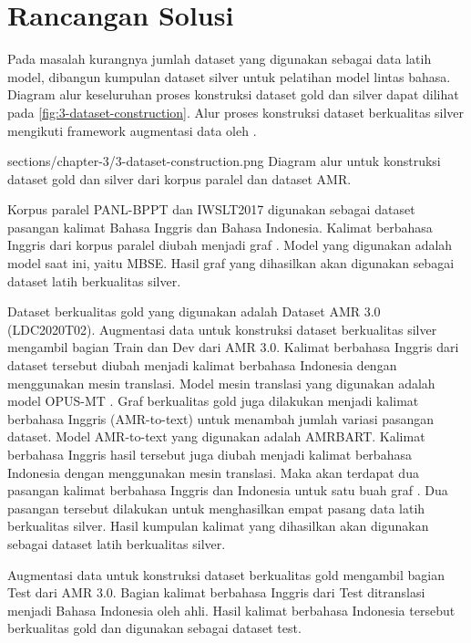 \section{Rancangan Solusi}

Pada masalah kurangnya jumlah dataset yang digunakan sebagai data latih model, dibangun kumpulan dataset silver untuk pelatihan model \amrparsing{} lintas bahasa.
Diagram alur keseluruhan proses konstruksi dataset gold dan silver dapat dilihat pada \cref{fig:3-dataset-construction}.
Alur proses konstruksi dataset berkualitas silver mengikuti framework augmentasi data oleh \textcite{lee2022}.

  {sections/chapter-3/3-dataset-construction.png}
  {Diagram alur untuk konstruksi dataset gold dan silver dari korpus paralel dan dataset AMR.}

Korpus paralel PANL-BPPT dan IWSLT2017 digunakan sebagai dataset pasangan kalimat Bahasa Inggris dan Bahasa Indonesia.
Kalimat berbahasa Inggris dari korpus paralel diubah menjadi graf \AMR{}.
Model \amrparsing{} yang digunakan adalah model \sota{} saat ini, yaitu \gls{MBSE}.
Hasil graf \AMR{} yang dihasilkan akan digunakan sebagai dataset latih berkualitas silver.

Dataset \AMR{} berkualitas gold yang digunakan adalah Dataset AMR 3.0 (LDC2020T02).
Augmentasi data untuk konstruksi dataset berkualitas silver mengambil bagian Train dan Dev  dari AMR 3.0.
Kalimat berbahasa Inggris dari dataset \AMR{} tersebut diubah menjadi kalimat berbahasa Indonesia dengan menggunakan mesin translasi.
Model mesin translasi yang digunakan adalah model {OPUS-MT} .
Graf \AMR{} berkualitas gold juga dilakukan  menjadi kalimat berbahasa Inggris (AMR-to-text) untuk menambah jumlah variasi pasangan dataset.
Model AMR-to-text yang digunakan adalah \gls{AMRBART}.
Kalimat berbahasa Inggris hasil  tersebut juga diubah menjadi kalimat berbahasa Indonesia dengan menggunakan mesin translasi.
Maka akan terdapat dua pasangan kalimat berbahasa Inggris dan Indonesia untuk satu buah graf \AMR{}.
Dua pasangan tersebut dilakukan  untuk menghasilkan empat pasang data latih berkualitas silver.
Hasil kumpulan kalimat yang dihasilkan akan digunakan sebagai dataset latih berkualitas silver.

Augmentasi data untuk konstruksi dataset berkualitas gold mengambil bagian Test  dari AMR 3.0.
Bagian kalimat berbahasa Inggris dari Test  ditranslasi menjadi Bahasa Indonesia oleh ahli.
Hasil kalimat berbahasa Indonesia tersebut berkualitas gold dan digunakan sebagai dataset test.

